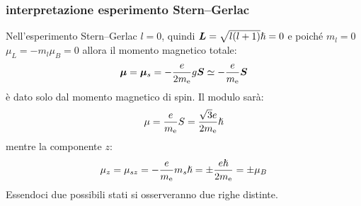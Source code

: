 \subsubsection{interpretazione esperimento Stern--Gerlac}
Nell'esperimento Stern--Gerlac $l=0$, quindi $\boldsymbol{L}=\sqrt{l(l+1)}\hslash=0$ e poiché $m_l=0$ $\mu_L=-m_l\mu_B=0$ allora il momento magnetico totale:
\begin{equation}
	\boldsymbol{\mu}=\boldsymbol{\mu}_s=-\frac{e}{2m_{\mathrm{e}}}g\boldsymbol{S}\simeq-\frac{e}{m_{\mathrm{e}}}\boldsymbol{S}
\end{equation}
è dato solo dal momento magnetico di spin. Il modulo sarà:
\begin{equation}
	\mu=\frac{e}{m_{\mathrm{e}}}S=\frac{\sqrt{3}e}{2 m_{\mathrm{e}}}\hslash
\end{equation}
mentre la componente $z$:
\begin{equation}
	\mu_z=\mu_{sz}=-\frac{e}{m_{\mathrm{e}}}m_s\hslash=\pm\frac{e\hslash}{2m_{\mathrm{e}}}=\pm\mu_B
\end{equation}
Essendoci due possibili stati si osserveranno due righe distinte.
